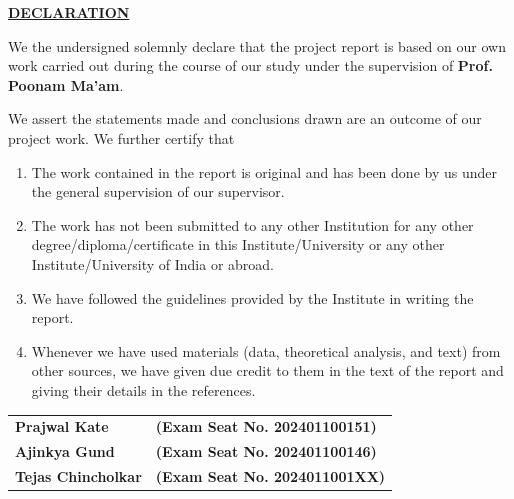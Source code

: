 \documentclass[12pt,a4paper]{report}
\begin{document}
\cleardoublepage

\thispagestyle{empty}
\begin{center}
    {\large \bfseries \underline{DECLARATION}}
\end{center}

\vspace{0.8cm}
\noindent We the undersigned solemnly declare that the project report is based on our own work carried out during the course of our study under the supervision of \textbf{Prof. Poonam Ma'am}.

\vspace{0.4cm}
\noindent We assert the statements made and conclusions drawn are an outcome of our project work. We further certify that
\begin{enumerate}[label=\arabic*.]
    \item The work contained in the report is original and has been done by us under the general supervision of our supervisor.
    \item The work has not been submitted to any other Institution for any other degree/diploma/certificate in this Institute/University or any other Institute/University of India or abroad.
    \item We have followed the guidelines provided by the Institute in writing the report.
    \item Whenever we have used materials (data, theoretical analysis, and text) from other sources, we have given due credit to them in the text of the report and giving their details in the references.
\end{enumerate}

\vspace{1.5cm}
\begin{tabular}{p{6.8cm} p{6.8cm}}
    \textbf{Prajwal Kate} & \textbf{(Exam Seat No. 202401100151)} \\
    \textbf{Ajinkya Gund} & \textbf{(Exam Seat No. 202401100146)} \\
    \textbf{Tejas Chincholkar} & \textbf{(Exam Seat No. 2024011001XX)} \\
\end{tabular}

\cleardoublepage

\setcounter{page}{4}
\end{document}
